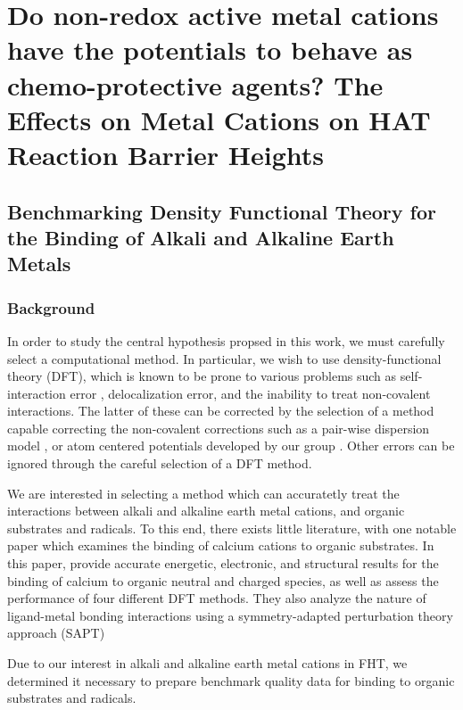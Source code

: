 
\chapter{Do non-redox active metal cations have the potentials to behave as
  chemo-protective agents? The Effects on Metal Cations on HAT Reaction Barrier
  Heights}
\label{ch:hat}

\section{Benchmarking Density Functional Theory for the Binding of
  Alkali and Alkaline Earth Metals}

\subsection{Background}

In order to study the central hypothesis propsed in this work, we must carefully
select a computational method. In particular, we wish to use density-functional
theory (DFT), which is known to be prone to various problems such as
self-interaction error \cite{Dutoi2006}, delocalization
error,\cite{OterodelaRoza2014} and the inability to treat non-covalent
interactions.\cite{Johnson2009,DiLabio2016} The latter of these can be corrected
by the selection of a method capable correcting the non-covalent corrections
such as a pair-wise dispersion model , or atom
centered potentials developed by our group
. Other errors can be ignored through the
careful selection of a DFT method.

We are interested in selecting a method which can accuratetly treat
the interactions between alkali and alkaline earth metal cations, and
organic substrates and radicals. To this end, there exists little
literature, with one notable paper\cite{Suarez2011} which examines the
binding of calcium cations to organic substrates. In this paper,
\citet{Suarez2011} provide accurate energetic, electronic, and
structural results for the binding of calcium to organic neutral and
charged species, as well as assess the performance of four different
DFT methods. They also analyze the nature of ligand-metal bonding
interactions using a symmetry-adapted perturbation theory approach
(SAPT) 

Due to our interest in alkali and alkaline earth metal cations in FHT,
we determined it necessary to prepare benchmark quality data for
binding to organic substrates and radicals.

